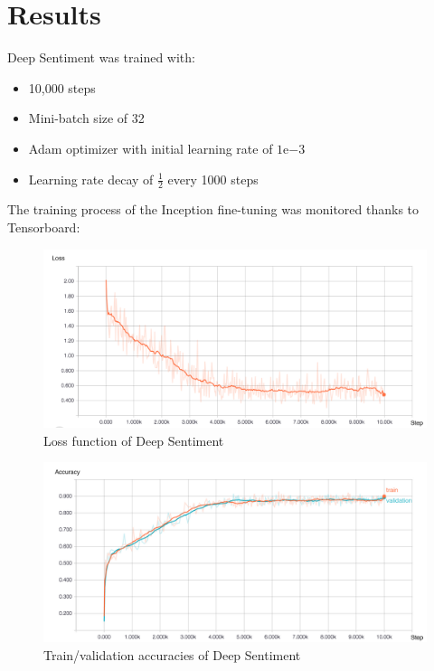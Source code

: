 \section{Results}
Deep Sentiment was trained with:
\begin{itemize}[topsep=0pt]
    \itemsep-1em
    \item 10,000 steps
    \item Mini-batch size of 32
    \item Adam optimizer with initial learning rate of $1\mathrm{e}{-3}$
    \item Learning rate decay of $\frac{1}{2}$ every 1000 steps
\end{itemize}

The training process of the Inception fine-tuning was monitored thanks to Tensorboard:
\begin{figure}[H]
    \centering
    \includegraphics[width=\textwidth]{Images/image_text_model_loss_cleaned.jpg}
    \caption{Loss function of Deep Sentiment}
\end{figure}

\begin{figure}[H]
    \centering
    \includegraphics[width=\textwidth]{Images/image_text_model_accuracies_cleaned.jpg}
    \caption{Train/validation accuracies of Deep Sentiment}
\end{figure}

